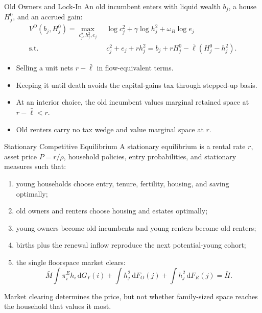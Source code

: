 \documentclass[aspectratio=169,11pt]{beamer}
\newcommand{\tightitems}{\setlength{\itemsep}{0.55em}}
\newcommand{\1}{\mathbf 1}
\begin{document}
\begin{frame}{Old Owners and Lock-In}
  An old incumbent enters with liquid wealth $b_j$, a house $H_j^0$, and an accrued gain:
  \[
  \begin{aligned}
    V^O(b_j,H_j^0)=\max_{c_j^2,h_j^2,e_j}\;&
      \log c_j^2+\gamma\log h_j^2+\omega_B\log e_j\\
    \text{s.t.}\quad
      &c_j^2+e_j+r h_j^2
      =b_j+rH_j^0-\bar\ell(H_j^0-h_j^2).
  \end{aligned}
  \]

  \begin{itemize}\tightitems
    \item Selling a unit nets $r-\bar\ell$ in flow-equivalent terms.
    \item Keeping it until death avoids the capital-gains tax through stepped-up basis.
    \item At an interior choice, the old incumbent values marginal retained space at $r-\bar\ell<r$.
    \item Old renters carry no tax wedge and value marginal space at $r$.
  \end{itemize}
\end{frame}

\begin{frame}{Stationary Competitive Equilibrium}
  A stationary equilibrium is a rental rate $r$, asset price $P=r/\rho$, household policies, entry probabilities, and stationary measures such that:

  \begin{enumerate}\tightitems
    \item young households choose entry, tenure, fertility, housing, and saving optimally;
    \item old owners and renters choose housing and estates optimally;
    \item young owners become old incumbents and young renters become old renters;
    \item births plus the renewal inflow reproduce the next potential-young cohort;
    \item the single floorspace market clears:
    \[
      \bar M\int \pi_i^E h_i\,\mathrm dG_Y(i)
      +\int h_j^2\,\mathrm dF_O(j)
      +\int h_j^2\,\mathrm dF_R(j)=\bar H.
    \]
  \end{enumerate}

  Market clearing determines the price, but not whether family-sized space reaches the household that values it most.
\end{frame}
\end{document}
